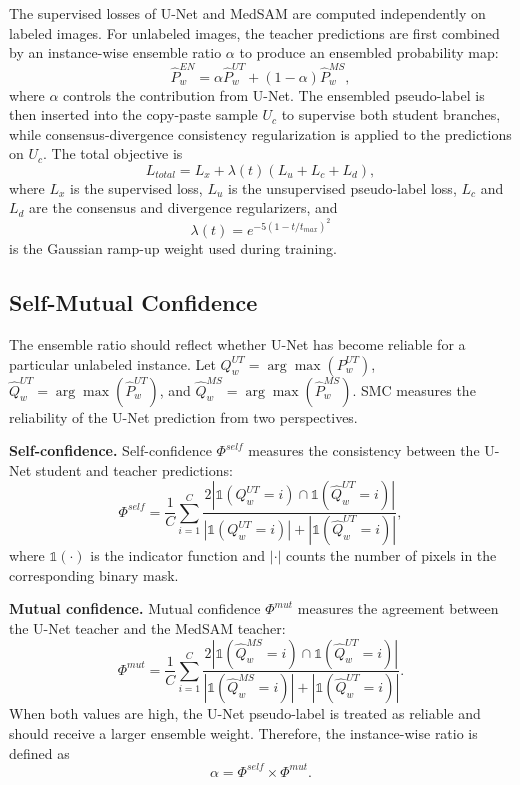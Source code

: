 The supervised losses of U-Net and MedSAM are computed independently on labeled images. For unlabeled images, the teacher predictions are first combined by an instance-wise ensemble ratio $\alpha$ to produce an ensembled probability map:
\begin{equation}
\hat{P}^{EN}_w=\alpha\hat{P}^{UT}_w+(1-\alpha)\hat{P}^{MS}_w,
\label{eq:ensemble}
\end{equation}
where $\alpha$ controls the contribution from U-Net. The ensembled pseudo-label is then inserted into the copy-paste sample $U_c$ to supervise both student branches, while consensus-divergence consistency regularization is applied to the predictions on $U_c$. The total objective is
\begin{equation}
L_{total}=L_x+\lambda(t)(L_u+L_c+L_d),
\label{eq:total_loss}
\end{equation}
where $L_x$ is the supervised loss, $L_u$ is the unsupervised pseudo-label loss, $L_c$ and $L_d$ are the consensus and divergence regularizers, and
\begin{equation}
\lambda(t)=e^{-5(1-t/t_{max})^2}
\label{eq:lambda}
\end{equation}
is the Gaussian ramp-up weight used during training.

\subsection{Self-Mutual Confidence}
The ensemble ratio should reflect whether U-Net has become reliable for a particular unlabeled instance. Let $Q^{UT}_w=\arg\max(P^{UT}_w)$, $\hat{Q}^{UT}_w=\arg\max(\hat{P}^{UT}_w)$, and $\hat{Q}^{MS}_w=\arg\max(\hat{P}^{MS}_w)$. SMC measures the reliability of the U-Net prediction from two perspectives.

\textbf{Self-confidence.} Self-confidence $\Phi^{self}$ measures the consistency between the U-Net student and teacher predictions:
\begin{equation}
\Phi^{self}=\frac{1}{C}\sum_{i=1}^{C}\frac{2\left|\mathds{1}(Q^{UT}_w=i)\cap\mathds{1}(\hat{Q}^{UT}_w=i)\right|}{\left|\mathds{1}(Q^{UT}_w=i)\right|+\left|\mathds{1}(\hat{Q}^{UT}_w=i)\right|},
\label{eq:self_conf}
\end{equation}
where $\mathds{1}(\cdot)$ is the indicator function and $|\cdot|$ counts the number of pixels in the corresponding binary mask.

\textbf{Mutual confidence.} Mutual confidence $\Phi^{mut}$ measures the agreement between the U-Net teacher and the MedSAM teacher:
\begin{equation}
\Phi^{mut}=\frac{1}{C}\sum_{i=1}^{C}\frac{2\left|\mathds{1}(\hat{Q}^{MS}_w=i)\cap\mathds{1}(\hat{Q}^{UT}_w=i)\right|}{\left|\mathds{1}(\hat{Q}^{MS}_w=i)\right|+\left|\mathds{1}(\hat{Q}^{UT}_w=i)\right|}.
\label{eq:mut_conf}
\end{equation}
When both values are high, the U-Net pseudo-label is treated as reliable and should receive a larger ensemble weight. Therefore, the instance-wise ratio is defined as
\begin{equation}
\alpha=\Phi^{self}\times\Phi^{mut}.
\label{eq:alpha}
\end{equation}

